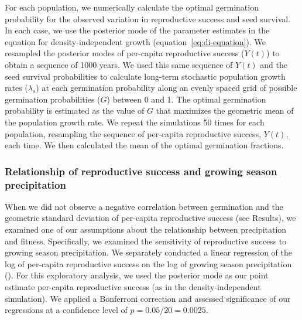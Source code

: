 \documentclass[12pt, oneside, titlepage]{article}   	%
\begin{document}
For each population, we numerically calculate the optimal germination probability for the observed variation in reproductive success and seed survival. In each case, we use the posterior mode of the parameter estimates in the equation for density-independent growth (equation~\eqref{eq:di-equation}). We resampled the posterior modes of per-capita reproductive success ($Y(t)$) to obtain a sequence of 1000 years. We used this same sequence of $Y(t)$ and the seed survival probabilities to calculate long-term stochastic population growth rates ($\lambda_s$) at each germination probability along an evenly spaced grid of possible germination probabilities ($G$) between 0 and 1. The optimal germination probability is estimated as the value of $G$ that maximizes the geometric mean of the population growth rate. We repeat the simulations 50 times for each population, resampling the sequence of per-capita reproductive success, $Y(t)$, each time. We then calculated the mean of the optimal germination fractions. 


\subsubsection{Relationship of reproductive success and growing season precipitation}

When we did not observe a negative correlation between germination and the geometric standard deviation of per-capita reproductive success (see Results), we examined one of our assumptions about the relationship between precipitation and fitness. Specifically, we examined the sensitivity of reproductive success to growing season precipitation. We separately conducted a linear regression of the log of per-capita reproductive success on the log of growing season precipitation (\cite{venable2007}). For this exploratory analysis, we used the posterior mode as our point estimate per-capita reproductive success (as in the density-independent simulation). We applied a Bonferroni correction and assessed significance of our regressions at a confidence level of $p=0.05/20=0.0025$.
\end{document}
